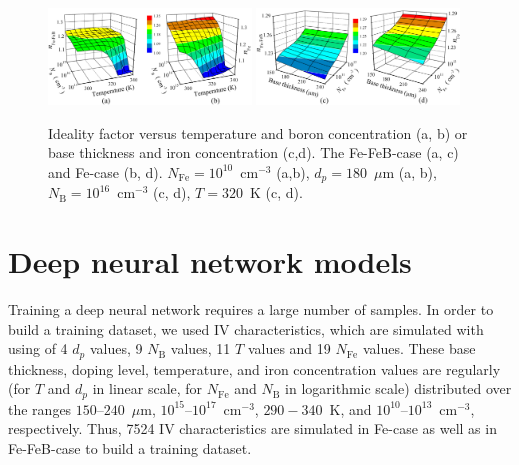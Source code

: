 \documentclass[num-refs]{wiley-article} %
\begin{document}
\begin{figure}[t]
\centering
\includegraphics[width=0.48\textwidth]{Fig1a}
\includegraphics[width=0.48\textwidth]{Fig1b}
\caption{Ideality factor versus temperature and boron concentration (a, b)
or base thickness and iron concentration (c,d).
The Fe-FeB-case (a, c) and Fe-case (b, d).
$N_\mathrm{Fe}=10^{10}$~cm$^{-3}$ (a,b),
$d_p=180$~$\mu$m (a, b),
$N_\mathrm{B}=10^{16}$~cm$^{-3}$ (c, d),
$T=320$~K (c, d).
}
\label{fig_nValues}
\end{figure}

\section{Deep neural network models}

Training a deep neural network requires a large number of samples.
In order to build a training dataset, we used IV characteristics, which
are simulated with using of 4 $d_p$ values, 9 $N_\mathrm{B}$ values, 11 $T$ values and 19 $N_{\mathrm{Fe}}$ values.
These base thickness, doping level, temperature, and iron concentration values are regularly (for $T$ and $d_p$ in linear scale, for $N_{\mathrm{Fe}}$ and $N_\mathrm{B}$ in logarithmic scale) distributed over the  ranges $150$--$240$~$\mu$m, $10^{15}$--$10^{17}$~cm$^{-3}$, $290-340$~K, and
$10^{10}$--$10^{13}$~cm$^{-3}$, respectively.
Thus, 7524 IV characteristics are simulated in Fe-case as well as in Fe-FeB-case to build a training dataset.
\end{document}
